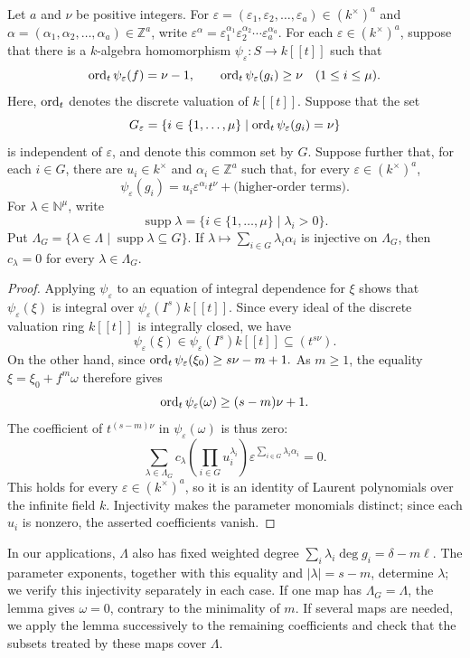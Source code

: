\begin{lemma}\label{lem:coefficient-separation}
Let $a$ and $\nu$ be positive integers.
For $\varepsilon=(\varepsilon_1,\varepsilon_2,\ldots,\varepsilon_a)
\in(k^\times)^a$ and $\alpha=(\alpha_1,\alpha_2,\ldots,\alpha_a)
\in\mathbb Z^a$, write
$\varepsilon^\alpha=\varepsilon_1^{\alpha_1}\varepsilon_2^{\alpha_2}
\cdots\varepsilon_a^{\alpha_a}$.
For each $\varepsilon\in(k^\times)^a$, suppose that there is a
$k$-algebra homomorphism $\psi_\varepsilon:S\to k[[t]]$ such that
\[
 \operatorname{ord}_t\psi_\varepsilon(f)=\nu-1,\qquad
 \operatorname{ord}_t\psi_\varepsilon(g_i)\geq\nu\quad(1\leq i\leq\mu).
\]
Here, $\operatorname{ord}_t$ denotes the discrete valuation of $k[[t]]$.
Suppose that the set
\[
 G_\varepsilon=\{i\in\{1,\ldots,\mu\}\mid
 \operatorname{ord}_t\psi_\varepsilon(g_i)=\nu\}
\]
is independent of $\varepsilon$, and denote this common set by $G$.
Suppose further that, for each $i\in G$, there are
$u_i\in k^\times$ and $\alpha_i\in\mathbb Z^a$ such that, for every
$\varepsilon\in(k^\times)^a$,
\[
 \psi_\varepsilon(g_i)
 =u_i\varepsilon^{\alpha_i}t^\nu+\text{(higher-order terms)}.
\]
For $\lambda\in\mathbb N^\mu$, write
\[
 \operatorname{supp}\lambda
 =\{i\in\{1,\ldots,\mu\}\mid\lambda_i>0\}.
\]
Put $\Lambda_G=\{\lambda\in\Lambda\mid\operatorname{supp}\lambda\subseteq G\}$.
If $\lambda\mapsto\sum_{i\in G}\lambda_i\alpha_i$ is injective on
$\Lambda_G$, then $c_\lambda=0$ for every $\lambda\in\Lambda_G$.
\end{lemma}

\begin{proof}
Applying $\psi_\varepsilon$ to an equation of integral dependence for
$\xi$ shows that $\psi_\varepsilon(\xi)$ is integral over
$\psi_\varepsilon(I^s)k[[t]]$. Since every ideal of the discrete valuation
ring $k[[t]]$ is integrally closed, we have
\[
 \psi_\varepsilon(\xi)\in\psi_\varepsilon(I^s)k[[t]]
 \subseteq(t^{s\nu}).
\]
On the other hand, since
 $
 \operatorname{ord}_t\psi_\varepsilon(\xi_0)\geq s\nu-m+1.
 $
As $m\geq1$, the equality $\xi=\xi_0+f^m\omega$ therefore gives
\[
 \operatorname{ord}_t\psi_\varepsilon(\omega)\geq(s-m)\nu+1.
\]
The coefficient of $t^{(s-m)\nu}$ in $\psi_\varepsilon(\omega)$ is thus zero:
\[
 \sum_{\lambda\in\Lambda_G}
 c_\lambda\left(\prod_{i\in G}u_i^{\lambda_i}\right)
 \varepsilon^{\sum_{i\in G}\lambda_i\alpha_i}=0.
\]
This holds for every $\varepsilon\in(k^\times)^a$, so it is an identity
of Laurent polynomials over the infinite field $k$. Injectivity makes
the parameter monomials distinct; since each $u_i$ is nonzero, the
asserted coefficients vanish.
\end{proof}

In our applications, $\Lambda$ also has fixed weighted degree
$\sum_i\lambda_i\deg g_i=\delta-m\ell$. The parameter exponents,
together with this equality and $|\lambda|=s-m$, determine $\lambda$;
we verify this injectivity separately in each case.
If one map has $\Lambda_G=\Lambda$, the lemma gives $\omega=0$,
contrary to the minimality of $m$. If several maps are needed, we apply
the lemma successively to the remaining coefficients and check that
the subsets treated by these maps cover $\Lambda$.
